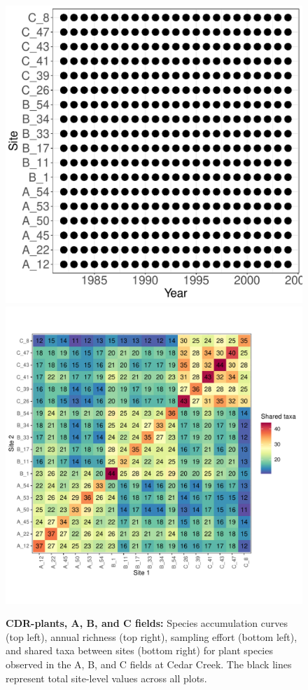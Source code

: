 \documentclass[11pt, oneside]{article}
\begin{document}
\begin{figure}[h!]
\includegraphics[scale = 0.4]{cdr-plantsABC-compagnoni_spatiotemporal_sampling_effort.pdf}
\includegraphics[scale = 0.4]{cdr-plantsABC-compagnoni_spp_shared.pdf}
\caption{{\bf CDR-plants, A, B, and C fields:} Species accumulation curves (top left),  annual richness (top right), sampling effort (bottom left), and shared taxa between sites (bottom right) for plant species observed in the A, B, and C fields at Cedar Creek. The black lines represent total site-level values across all plots.}
\label{cdrABC-plants}
\end{figure}
\end{document}
